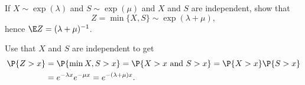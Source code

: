 \begin{question}\label{ex:10}
  If $X\sim\exp(\lambda)$ and $S\sim\exp(\mu)$ and $X$ and $S$ are
  independent, show that 
  \begin{equation*}
Z=\min\{X,S\}\sim\exp(\lambda+\mu),
  \end{equation*}
hence $\E Z = (\lambda+\mu)^{-1}$.

\begin{hint}
\end{hint}

  \begin{solution}
Use that $X$ and $S$ are independent to get
    \begin{equation*}
      \begin{split}
      \P{Z>x} 
&= \P{\min{X,S}>x} = \P{X>x\text{ and } S>x} = \P{X>x}\P{S>x} \\
&= e^{-\lambda x} e^{-\mu x} = e^{-(\lambda+\mu)x}.
      \end{split}
    \end{equation*}
  \end{solution}

\end{question}

